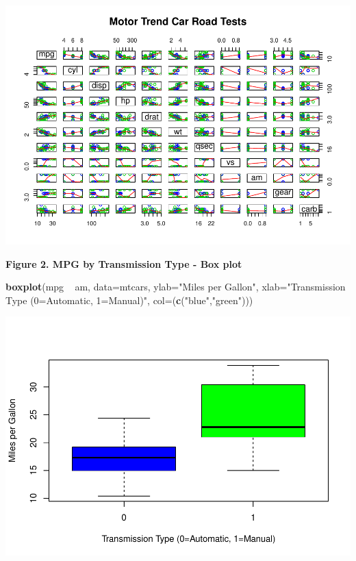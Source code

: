 \documentclass[]{article}
\newenvironment{Shaded}{\begin{snugshade}}{\end{snugshade}}
\newcommand{\KeywordTok}[1]{\textcolor[rgb]{0.13,0.29,0.53}{\textbf{{#1}}}}
\newcommand{\DataTypeTok}[1]{\textcolor[rgb]{0.13,0.29,0.53}{{#1}}}
\newcommand{\StringTok}[1]{\textcolor[rgb]{0.31,0.60,0.02}{{#1}}}
\newcommand{\NormalTok}[1]{{#1}}
\begin{document}
\includegraphics{./Regression_Models_-_Course_Project_files/figure-latex/unnamed-chunk-6.pdf}

\textbf{Figure 2. MPG by Transmission Type - Box plot}

\begin{Shaded}
\begin{Highlighting}[]
\KeywordTok{boxplot}\NormalTok{(mpg ~}\StringTok{ }\NormalTok{am, }\DataTypeTok{data=}\NormalTok{mtcars, }\DataTypeTok{ylab=}\StringTok{"Miles per Gallon"}\NormalTok{, }\DataTypeTok{xlab=}\StringTok{"Transmission Type (0=Automatic, 1=Manual)"}\NormalTok{, }\DataTypeTok{col=}\NormalTok{(}\KeywordTok{c}\NormalTok{(}\StringTok{"blue"}\NormalTok{,}\StringTok{"green"}\NormalTok{)))}
\end{Highlighting}
\end{Shaded}

\includegraphics{./Regression_Models_-_Course_Project_files/figure-latex/unnamed-chunk-7.pdf}
\end{document}
